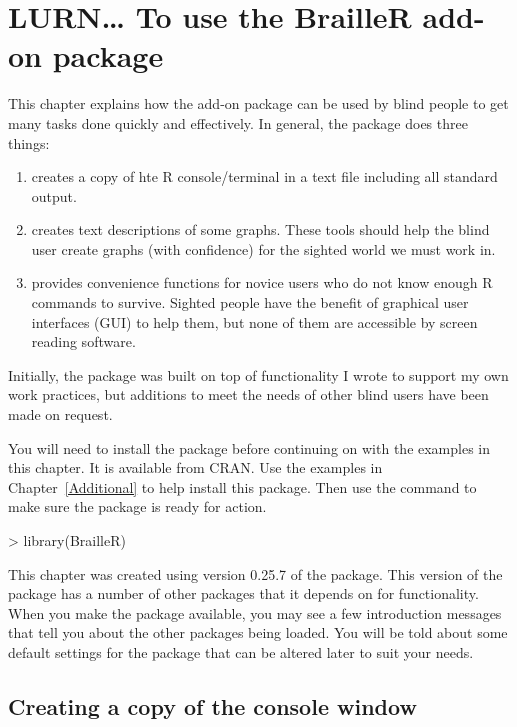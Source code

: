 

\chapter{LURN\ldots{} To use the BrailleR add-on package} 
\label{BrailleR} 
 

 
This chapter explains how the  add-on package can be used by blind people to get many tasks done quickly and effectively. In general, the package does three things:\begin{enumerate} 
\item creates a copy of hte R console/terminal in a text file including all standard output. 
\item creates text descriptions of some graphs. These tools should help the blind user create graphs (with confidence) for the sighted world we must work in. 
\item provides convenience functions for novice users who do not know enough R commands to survive. Sighted people have the benefit of graphical user interfaces (GUI) to help them, but none of them are accessible by screen reading software. 
\end{enumerate} 
Initially, the package was built on top of functionality I wrote to support my own work practices, but additions to meet the needs of other blind \R{} users have been made on request.  
 
 
You will need to install the  package before continuing on with the examples in this chapter. It is available from CRAN. Use the examples in Chapter~\ref{Additional} to help install this package. Then use the  command to make sure the package is ready for action. 
\begin{Schunk}
\begin{Sinput}
> library(BrailleR) 
\end{Sinput}
\end{Schunk}
This chapter was created using version 0.25.7 of the  package. This version of the package has a number of other packages that it depends on for functionality. When you make the  package available, you may see a few introduction messages that tell you about the other packages being loaded. You will be told about some default settings for the package that can be altered later to suit your needs. 
 
 
\section{Creating a copy of the \R{} console window}\label{CreateCopyConsole} 
 
